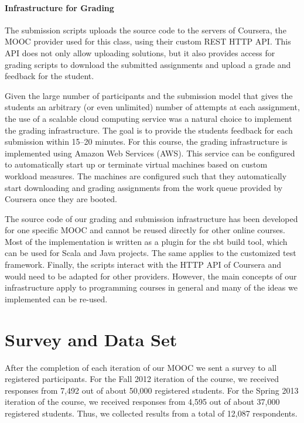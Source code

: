 \documentclass{sig-alternate}
\begin{document}
\paragraph{Infrastructure for Grading}

The submission scripts uploads the source code to the servers of Coursera, the
MOOC provider used for this class, using their custom REST HTTP API. This API
does not only allow uploading solutions, but it also provides access for grading
scripts to download the submitted assignments and upload a grade and feedback
for the student.

Given the large number of participants and the submission model that gives the
students an arbitrary (or even unlimited) number of attempts at each assignment, the use of a scalable
cloud computing service was a natural choice to implement the grading infrastructure.
The goal is to provide the students feedback for each submission within 15--20
minutes. For this course, the grading infrastructure is implemented using Amazon
Web Services (AWS). This service can be configured to automatically start up or
terminate virtual machines based on custom workload measures. The machines are
configured such that they automatically start downloading and grading assignments
from the work queue provided by Coursera once they are booted.

The source code of our grading and submission infrastructure has been developed
for one specific MOOC and cannot be reused directly for other online courses.
Most of the implementation is written as a plugin for the sbt build tool, which
can be used for Scala and Java projects. The same applies to the customized test
framework. Finally, the scripts interact with the HTTP API of Coursera and would
need to be adapted for other providers. However, the main concepts of our
infrastructure apply to programming courses in general and many of the ideas
we implemented can be re-used.




\section{Survey and Data Set}
\label{sec:survey-data-set}

After the completion of each iteration of our MOOC we sent a survey to all
registered participants. For the Fall 2012 iteration of the course, we
received responses from 7,492 out of about 50,000 registered students. For the
Spring 2013 iteration of the course, we received responses from 4,595 out of
about 37,000 registered students. Thus, we collected results from a total of
12,087 respondents.
\end{document}
